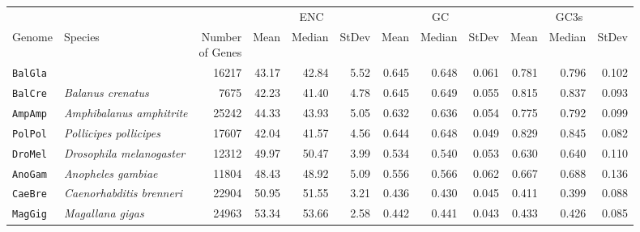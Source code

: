 \begin{table}
    \centering
    \small
    \label{tab:sup_enc_summary}
    \begin{tabular}{llrrrrrrrrrr}
    \toprule
    & & & \multicolumn{3}{c}{ENC} & \multicolumn{3}{c}{GC} & \multicolumn{3}{c}{GC3s} \\
    \cmidrule(lr){4-6} \cmidrule(lr){7-9} \cmidrule(lr){10-12}
    Genome &
        Species &
        \shortstack{Number \\ of Genes} &
        Mean & Median & StDev &
        Mean & Median & StDev &
        Mean & Median & StDev \\
    \midrule
    \texttt{BalGla} & \balgla{}                              & \num{16217} & 43.17 & 42.84 & 5.52 & 0.645 & 0.648 & 0.061 & 0.781 & 0.796 & 0.102 \\
    \texttt{BalCre} & \textit{Balanus crenatus}              & \num{7675}  & 42.23 & 41.40 & 4.78 & 0.645 & 0.649 & 0.055 & 0.815 & 0.837 & 0.093 \\
    \texttt{AmpAmp} & \textit{Amphibalanus amphitrite}       & \num{25242} & 44.33 & 43.93 & 5.05 & 0.632 & 0.636 & 0.054 & 0.775 & 0.792 & 0.099 \\
    \texttt{PolPol} & \textit{Pollicipes pollicipes}         & \num{17607} & 42.04 & 41.57 & 4.56 & 0.644 & 0.648 & 0.049 & 0.829 & 0.845 & 0.082 \\
    \texttt{DroMel} & \textit{Drosophila melanogaster}       & \num{12312} & 49.97 & 50.47 & 3.99 & 0.534 & 0.540 & 0.053 & 0.630 & 0.640 & 0.110 \\
    \texttt{AnoGam} & \textit{Anopheles gambiae}             & \num{11804} & 48.43 & 48.92 & 5.09 & 0.556 & 0.566 & 0.062 & 0.667 & 0.688 & 0.136 \\
    \texttt{CaeBre} & \textit{Caenorhabditis brenneri}       & \num{22904} & 50.95 & 51.55 & 3.21 & 0.436 & 0.430 & 0.045 & 0.411 & 0.399 & 0.088 \\
    \texttt{MagGig} & \textit{Magallana gigas}               & \num{24963} & 53.34 & 53.66 & 2.58 & 0.442 & 0.441 & 0.043 & 0.433 & 0.426 & 0.085 \\

\end{tabular}
\end{table}
